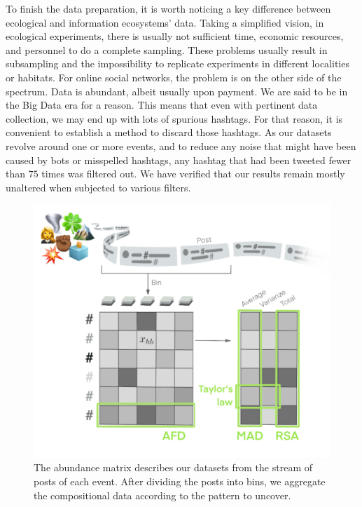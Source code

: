 To finish the data preparation, it is worth noticing a key difference between ecological and information ecosystems' data. Taking a simplified vision, in ecological experiments, there is usually not sufficient time, economic resources, and personnel to do a complete sampling. These problems usually result in subsampling and the impossibility to replicate experiments in different localities or habitats. For online social networks, the problem is on the other side of the spectrum. Data is abundant, albeit usually upon payment. We are said to be in the Big Data era for a reason. This means that even with pertinent data collection, we may end up with lots of spurious hashtags. For that reason, it is convenient to establish a method to discard those hashtags. As our datasets revolve around one or more events, and to reduce any noise that might have been caused by bots or misspelled hashtags, any hashtag that had been tweeted fewer than $75$ times was filtered out. We have verified that our results remain mostly unaltered when subjected to various filters.


\begin{figure}[t]
     \centering
\includegraphics[width=\columnwidth]{figures/chp4/alagrilli.pdf}
 \caption[Data representation]{ The abundance matrix describes our datasets from the stream of posts of each event. After dividing the posts into bins, we aggregate the compositional data according to the pattern to uncover.}
\label{fig:image}
\end{figure}

